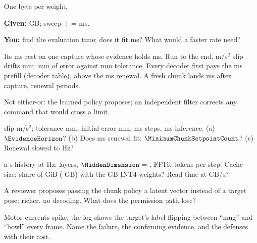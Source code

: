 \documentclass{studysheet}
\begin{document}
\begin{leftcol}
\vspace{10pt}
\begin{practicebox}
One byte per weight.\par\vspace{3pt}
\textbf{Given:}  GB; sweep  $\div$  =  ms.\par
\textbf{You:} find the evaluation time; does it fit  ms? What would a faster rate need?\par\vspace{30pt}
\end{practicebox}
\end{leftcol}%
\begin{rightcol}
%
  {Its  ms rest on one capture whose evidence holds  ms. Run to the end,  m/s$^2$
   slip drifts  mm:  mm of error against  mm tolerance.}{}
%
  {Every decoder first pays the  ms prefill (decoder table), above the
    ms renewal. A fresh chunk lands  ms after capture,  renewal periods.}{}

%
  {Not either-or: the learned policy proposes; an independent filter corrects any command that would cross a
   limit.}{}

\vspace{2pt}
\begin{qs}
\item \assumed{} slip  m/s$^2$; tolerance  mm, initial error  mm,  ms steps,
   ms inference. (a) $\EvidenceHorizon$? (b) Does  ms renewal fit; $\MinimumChunkSetpointCount$? (c) Renewal slowed to  Hz?
\item \assumed{} a  s history at  Hz:  layers, $\HiddenDimension$ = , FP16,
   tokens per step. Cache size; share of  GiB ( GB) with the  GB INT4 weights? Read time at  GB/s?
\item A reviewer proposes passing the chunk policy a latent vector instead of a target pose: richer, no
  decoding. What does the permission path lose?
\item Motor currents spike; the log shows the target's label flipping between ``mug'' and ``bowl'' every
  frame. Name the failure, the confirming evidence, and the defenses with their cost.
\end{qs}
\end{rightcol}
\end{document}
